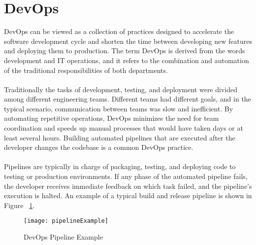 \section{DevOps} %
\label{sec:dev_ops}

DevOps can be viewed as a collection of practices designed to accelerate the software development cycle and shorten the time between developing new features and deploying them to production.
The term DevOps is derived from the words development and IT operations, and it refers to the combination and automation of the traditional responsibilities of both departments.

\paragraph{}

Traditionally the tasks of development, testing, and deployment were divided among different engineering teams.
Different teams had different goals, and in the typical scenario, communication between teams was slow and inefficient.
By automating repetitive operations, DevOps minimizes the need for team coordination and speeds up manual processes that would have taken days or at least several hours.
Building automated pipelines that are executed after the developer changes the codebase is a common DevOps practice.

\paragraph{}

Pipelines are typically in charge of packaging, testing, and deploying code to testing or production environments.
If any phase of the automated pipeline fails, the developer receives immediate feedback on which task failed, and the pipeline's execution is halted.
An example of a typical build and release pipeline is shown in Figure ~\ref{fig:pipeline_example}.

\begin{figure}[htbp]
    \centering
    \texttt{[image: pipelineExample]}
    \caption{DevOps Pipeline Example}
    \label{fig:pipeline_example}
\end{figure}
